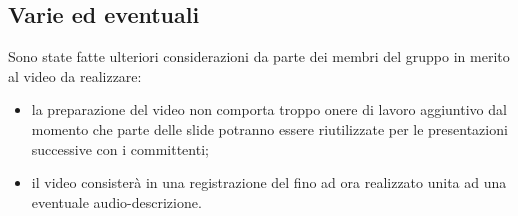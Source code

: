 	\subsection*{Varie ed eventuali}
		Sono state fatte ulteriori considerazioni da parte dei membri del gruppo in merito al video da realizzare:
		\begin{itemize}
			\item la preparazione del video non comporta troppo onere di lavoro aggiuntivo dal momento che parte delle slide potranno essere riutilizzate per le presentazioni successive con i committenti;
			\item il video consisterà in una registrazione del  fino ad ora realizzato unita ad una eventuale audio-descrizione. 
		\end{itemize}